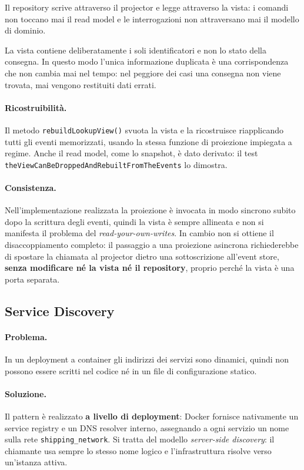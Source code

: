 \documentclass[12pt,a4paper]{article}
\begin{document}
Il repository scrive attraverso il projector e legge attraverso la vista: i comandi non toccano mai
il read model e le interrogazioni non attraversano mai il modello di dominio.

La vista contiene deliberatamente i soli identificatori e non lo stato della consegna. In questo modo
l'unica informazione duplicata \`e una corrispondenza che non cambia mai nel tempo: nel peggiore dei
casi una consegna non viene trovata, mai vengono restituiti dati errati.

\paragraph{Ricostruibilit\`a.} Il metodo \texttt{rebuildLookupView()} svuota la vista e la ricostruisce
riapplicando tutti gli eventi memorizzati, usando la stessa funzione di proiezione impiegata a regime.
Anche il read model, come lo snapshot, \`e dato derivato: il test
\texttt{theViewCanBeDroppedAndRebuiltFromTheEvents} lo dimostra.

\paragraph{Consistenza.} Nell'implementazione realizzata la proiezione \`e invocata in modo sincrono
subito dopo la scrittura degli eventi, quindi la vista \`e sempre allineata e non si manifesta il
problema del \emph{read-your-own-writes}. In cambio non si ottiene il disaccoppiamento completo: il
passaggio a una proiezione asincrona richiederebbe di spostare la chiamata al projector dietro una
sottoscrizione all'event store, \textbf{senza modificare n\'e la vista n\'e il repository}, proprio
perch\'e la vista \`e una porta separata.

\subsection{Service Discovery}

\paragraph{Problema.} In un deployment a container gli indirizzi dei servizi sono dinamici, quindi non
possono essere scritti nel codice n\'e in un file di configurazione statico.

\paragraph{Soluzione.} Il pattern \`e realizzato \textbf{a livello di deployment}: Docker fornisce
nativamente un service registry e un DNS resolver interno, assegnando a ogni servizio un nome sulla
rete \texttt{shipping\_network}. Si tratta del modello \emph{server-side discovery}: il chiamante usa
sempre lo stesso nome logico e l'infrastruttura risolve verso un'istanza attiva.
\end{document}
